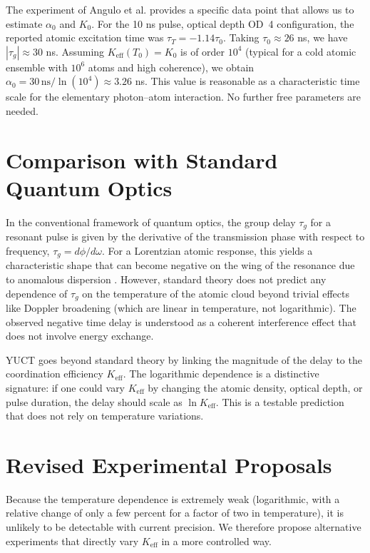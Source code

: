 \documentclass[12pt,a4paper]{article}
\newcommand{\Keff}{K_{\mathrm{eff}}}
\begin{document}
	The experiment of Angulo et al. \cite{Angulo2024} provides a specific data point that allows us to estimate \(\alpha_0\) and \(K_0\). For the 10 ns pulse, optical depth OD~4 configuration, the reported atomic excitation time was \(\tau_T = -1.14 \tau_0\). Taking \(\tau_0 \approx 26\) ns, we have \(|\tau_g| \approx 30\) ns. Assuming \(\Keff(T_0) = K_0\) is of order \(10^4\) (typical for a cold atomic ensemble with \(10^6\) atoms and high coherence), we obtain \(\alpha_0 = 30\,\text{ns} / \ln(10^4) \approx 3.26\) ns. This value is reasonable as a characteristic time scale for the elementary photon–atom interaction. No further free parameters are needed.
	
	\section{Comparison with Standard Quantum Optics}
	
	In the conventional framework of quantum optics, the group delay \(\tau_g\) for a resonant pulse is given by the derivative of the transmission phase with respect to frequency, \(\tau_g = d\phi/d\omega\). For a Lorentzian atomic response, this yields a characteristic shape that can become negative on the wing of the resonance due to anomalous dispersion \cite{Milonni2004}. However, standard theory does not predict any dependence of \(\tau_g\) on the temperature of the atomic cloud beyond trivial effects like Doppler broadening (which are linear in temperature, not logarithmic). The observed negative time delay is understood as a coherent interference effect that does not involve energy exchange.
	
	YUCT goes beyond standard theory by linking the magnitude of the delay to the coordination efficiency \(\Keff\). The logarithmic dependence is a distinctive signature: if one could vary \(\Keff\) by changing the atomic density, optical depth, or pulse duration, the delay should scale as \(\ln\Keff\). This is a testable prediction that does not rely on temperature variations.
	
	\section{Revised Experimental Proposals}
	
	Because the temperature dependence is extremely weak (logarithmic, with a relative change of only a few percent for a factor of two in temperature), it is unlikely to be detectable with current precision. We therefore propose alternative experiments that directly vary \(\Keff\) in a more controlled way.
	
\end{document}
